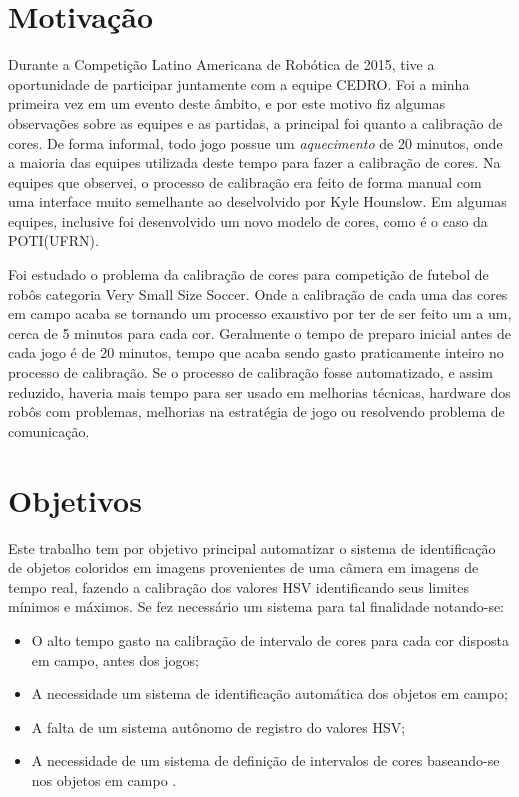 \section{Motivação}
Durante a Competição Latino Americana de Robótica de 2015, tive a oportunidade de participar juntamente com a equipe CEDRO. Foi a minha primeira vez em um evento deste âmbito, e por este motivo fiz algumas observações sobre as equipes e as partidas, a principal foi quanto a calibração de cores. De forma informal, todo jogo possue um \textit{aquecimento} de 20 minutos, onde a maioria das equipes utilizada deste tempo para fazer a calibração de cores. Na equipes que observei, o processo de calibração era feito de forma manual com uma interface muito semelhante ao deselvolvido por Kyle Hounslow\cite{YouTube}. Em algumas equipes, inclusive foi desenvolvido um novo modelo de cores, como é o caso da POTI(UFRN)\cite{Martins:2007}.

Foi estudado o problema da calibração de cores para competição de futebol de robôs categoria Very Small Size Soccer. Onde a calibração de cada uma das cores em campo acaba se tornando um processo exaustivo por ter de ser feito um a um, cerca de 5 minutos para cada cor. Geralmente o tempo de preparo inicial antes de cada jogo é de 20 minutos, tempo que acaba sendo gasto praticamente inteiro no processo de calibração. Se o processo de calibração fosse automatizado, e assim reduzido, haveria mais tempo para ser usado em melhorias técnicas, hardware dos robôs com problemas, melhorias na estratégia de jogo ou resolvendo problema de comunicação.

\section{Objetivos}

Este trabalho tem por objetivo principal automatizar o sistema de identificação de objetos 
coloridos em imagens provenientes de uma câmera em imagens de tempo real, fazendo a calibração dos valores HSV identificando seus limites mínimos e máximos.  
Se fez necessário um sistema para tal finalidade notando-se:

\begin{itemize}
	\item O alto tempo gasto na calibração de intervalo de cores para cada cor disposta em campo, antes dos jogos;
	\item A necessidade um sistema de identificação automática dos objetos em campo;
	\item A falta de um sistema autônomo de registro do valores HSV;
	\item A necessidade de um sistema de definição de intervalos de cores baseando-se nos objetos em campo .
\end{itemize}


